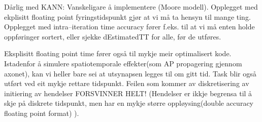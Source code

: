 

Dårlig med KANN: Vanskeligare å implementere (Moore modell).
Opplegget med ekplisitt floating point fyringstidspunkt gjør at vi må ta hensyn til mange ting. Opplegget med intra--iteration time accuracy fører f.eks. til at vi må enten holde oppføringer sortert, 
	eller sjekke dEstimatedTT for alle, før de utføres.

Eksplisitt floating point time fører også til mykje meir optimalisert kode. Istadenfor å simulere spatiotemporale effekter(som AP propagering gjennom axonet), kan vi heller bare sei at utsynapsen legges til om gitt tid.
	Task blir også utført ved eit mykje rettare tidspunkt. Feilen som kommer av diskretisering av initiering av hendelser FORSVINNER HELT!
	(Hendelser er ikkje begrensa til å skje på diskrete tidspunkt, men har en mykje større oppløysing(double accuracy floating point format) ).
